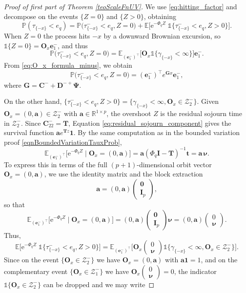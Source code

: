 \documentclass[a4paper,11pt]{article}
\numberwithin{equation}{section}
\theoremstyle{plain}
\theoremstyle{definition}
\newcommand{\1}{\mathbf{1}}
\newcommand{\e}{\mathrm{e}}
\newcommand{\PP}{\mathbb{P}}
\begin{document}
\begin{proof}[Proof of first part of Theorem \ref{teoScaleFnUV}]
We use \eqref{eq:hitting_factor} and decompose on the events $\{Z=0\}$ and $\{Z>0\}$, obtaining
\[
\PP(\tau_{\{-x\}} < e_q) = \mathbb{P}\big(\tau^-_{\{-x\}} < e_q,Z=0\big)+\mathbb{E}\Big[\e^{-\Phi_q Z}\;\mathds{1}\big\{\tau^-_{\{-x\}} < e_q,Z>0\big\}\Big].
\]
When $Z=0$ the process hits $-x$ by a downward Brownian excursion, so $\mathds{1}\{Z=0\}=\bm O_{x}\bm{e}_1^-$, and thus
\[
\mathbb{P}\big(\tau^-_{\{-x\}} < e_q,Z=0\big)=\mathbb{E}_{(\bm{e}_1^-)^\intercal}\big[\bm O_x\mathds{1}\{\gamma_{\{-x\}}<\infty\}\big]\bm{e}_1^-.
\]
From \eqref{eq:O_x_formula_minus}, we obtain
\[
\mathbb{P}\big(\tau^-_{\{-x\}} < e_q,Z=0\big)=(\bm{e}_1^-)^\intercal e^{\bm{G}x}\bm{e}_1^-,
\]
where $\bm{G}=\bm{C}^- + \bm{D}^{-+}\bm{\Psi}$.

On the other hand, $\{\tau^-_{\{-x\}} < e_q, Z>0\} = \{\gamma_{\{-x\}}<\infty, \bm{O}_x\in \mathcal{Z}^-_2\}$. Given $\bm{O}_x = (0,\bm{a}) \in \mathcal{Z}_2^-$ with $\bm{a} \in \mathbb{R}^{1\times p}$, the overshoot $Z$ is the residual sojourn time in $\mathcal{Z}_2^-$. Since $\bm{C}_{22}^- = \bm{T}$, Equation \eqref{eq:residual_sojourn_component} gives the survival function $\bm{a}e^{\bm{T}z}\bm{1}$. By the same computation as in the bounded variation proof \eqref{eqnBoundedVariationTauxProb},
\[
\mathbb{E}_{(\bm{e}_1^-)^\intercal}\big[\e^{-\Phi_q Z} \mid \bm{O}_x = (0,\bm{a})\big] = \bm{a}(\Phi_q\bm{I}-\bm{T})^{-1}\bm{t} = \bm{a}\,\bm{\nu}.
\]
To express this in terms of the full $(p+1)$-dimensional orbit vector $\bm{O}_x = (0,\bm{a})$, we use the identity matrix and the block extraction
\[
\bm{a} = (0,\bm{a})\begin{pmatrix}\bm{0}\\\bm{I}_p\end{pmatrix},
\]
so that
\[
\mathbb{E}_{(\bm{e}_1^-)^\intercal}\big[\e^{-\Phi_q Z} \mid \bm{O}_x=(0,\bm{a})\big] = (0,\bm{a})\begin{pmatrix}\bm{0}\\\bm{I}_p\end{pmatrix}\bm{\nu} = (0,\bm{a})\begin{pmatrix}0\\\bm{\nu}\end{pmatrix}.
\]
Thus,
\[
\mathbb{E}\Big[\e^{-\Phi_q Z}\;\mathds{1}\big\{\tau^-_{\{-x\}} < e_q,Z>0\big\}\Big] = \mathbb{E}_{(\bm{e}_1^-)^\intercal}\Big[\bm{O}_x\begin{pmatrix}0\\\bm{\nu}\end{pmatrix}\mathds{1}\{\gamma_{\{-x\}} < \infty, \bm{O}_x\in\mathcal{Z}_2^-\}\Big].
\]
Since on the event $\{\bm{O}_x\in\mathcal{Z}_2^-\}$ we have $\bm{O}_x=(0,\bm{a})$ with $\bm{a}\bm{1}=1$, and on the complementary event $\{\bm{O}_x\in\mathcal{Z}_1^-\}$ we have $\bm{O}_x\begin{pmatrix}0\\\bm{\nu}\end{pmatrix}=0$, the indicator $\mathds{1}\{\bm{O}_x\in\mathcal{Z}_2^-\}$ can be dropped and we may write

\end{proof}
\end{document}

